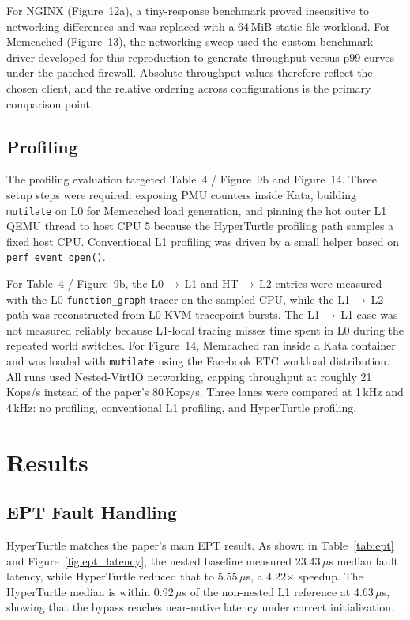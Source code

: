 \documentclass[11pt]{article}
\begin{document}
For NGINX (Figure~12a), a tiny-response benchmark proved insensitive to networking differences and was replaced with a 64\,MiB static-file workload. For Memcached (Figure~13), the networking sweep used the custom benchmark driver developed for this reproduction to generate throughput-versus-p99 curves under the patched firewall. Absolute throughput values therefore reflect the chosen client, and the relative ordering across configurations is the primary comparison point.

\subsection{Profiling}

The profiling evaluation targeted Table~4 / Figure~9b and Figure~14. Three setup steps were required: exposing PMU counters inside Kata, building \texttt{mutilate} on L0 for Memcached load generation, and pinning the hot outer L1 QEMU thread to host CPU 5 because the HyperTurtle profiling path samples a fixed host CPU. Conventional L1 profiling was driven by a small helper based on \texttt{perf\_event\_open()}.

For Table~4 / Figure~9b, the L0\,$\to$\,L1 and HT\,$\to$\,L2 entries were measured with the L0 \texttt{function\_graph} tracer on the sampled CPU, while the L1\,$\to$\,L2 path was reconstructed from L0 KVM tracepoint bursts. The L1\,$\to$\,L1 case was not measured reliably because L1-local tracing misses time spent in L0 during the repeated world switches. For Figure~14, Memcached ran inside a Kata container and was loaded with \texttt{mutilate} using the Facebook ETC workload distribution. All runs used Nested-VirtIO networking, capping throughput at roughly 21\,Kops/s instead of the paper's 80\,Kops/s. Three lanes were compared at 1\,kHz and 4\,kHz: no profiling, conventional L1 profiling, and HyperTurtle profiling.

\section{Results}

\subsection{EPT Fault Handling}

HyperTurtle matches the paper's main EPT result. As shown in Table~\ref{tab:ept} and Figure~\ref{fig:ept_latency}, the nested baseline measured 23.43\,$\mu$s median fault latency, while HyperTurtle reduced that to 5.55\,$\mu$s, a 4.22$\times$ speedup. The HyperTurtle median is within 0.92\,$\mu$s of the non-nested L1 reference at 4.63\,$\mu$s, showing that the bypass reaches near-native latency under correct initialization.
\end{document}
